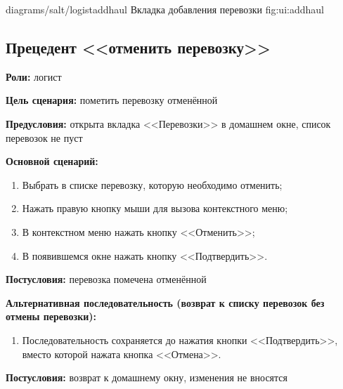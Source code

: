 \image
    {diagrams/salt/logistaddhaul}
    {Вкладка добавления перевозки}
    {fig:ui:addhaul}


\subsection{Прецедент <<отменить перевозку>>}
\textbf{Роли:} логист \par
\textbf{Цель сценария:} пометить перевозку отменённой \par
\textbf{Предусловия:} открыта вкладка <<Перевозки>> в домашнем окне, 
     список перевозок не пуст \par
\textbf{Основной сценарий:} 
\begin{enumerate}
    \item Выбрать в списке перевозку, которую необходимо отменить;
    \item Нажать правую кнопку мыши для вызова контекстного меню;
    \item В контекстном меню нажать кнопку <<Отменить>>;
    \item В появившемся окне нажать кнопку <<Подтвердить>>.
\end{enumerate} \par
\textbf{Постусловия:} перевозка помечена отменённой \par
\textbf{Альтернативная последовательность 
    (возврат к списку перевозок без отмены перевозки):} \par
\begin{enumerate}
    \item Последовательность сохраняется до нажатия кнопки <<Подтвердить>>, 
        вместо которой нажата кнопка <<Отмена>>.
\end{enumerate} \par
\textbf{Постусловия:} возврат к домашнему окну, изменения не вносятся \par

